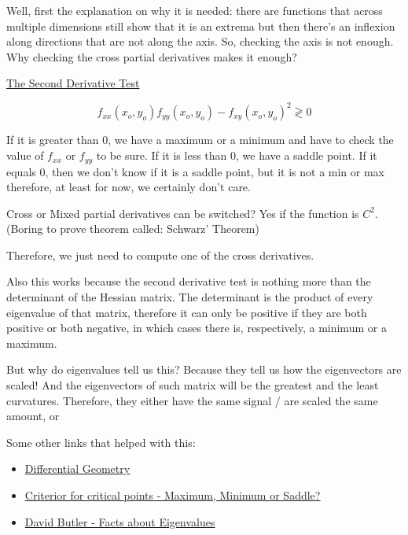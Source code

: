 Well, first the explanation on why it is needed: there are functions that across multiple dimensions still show that it is an extrema but then there's an inflexion along directions that are not along the axis. So, checking the axis is not enough. Why checking the cross partial derivatives makes it enough?

\ul{The Second Derivative Test}

\begin{equation}
    f_{xx}(x_o, y_o) f_{yy}(x_o, y_o) - f_{xy}(x_o, y_o)^2 \gtrless 0
\end{equation}

If it is greater than 0, we have a maximum or a minimum and have to check the value of $f_{xx}$ or $f_{yy}$ to be sure. If it is less than 0, we have a saddle point. If it equals 0, then we don't know if it is a saddle point, but it is not a min or max therefore, at least for now, we certainly don't care.

Cross or Mixed partial derivatives can be switched? Yes if the function is $C^2$. 
(Boring to prove theorem called: Schwarz' Theorem)

Therefore, we just need to compute one of the cross derivatives.


Also this works because the second derivative test is nothing more than the determinant of the Hessian matrix. The determinant is the product of every eigenvalue of that matrix, therefore it can only be positive if they are both positive or both negative, in which cases there is, respectively, a minimum or a maximum. 

But why do eigenvalues tell us this? Because they tell us how the eigenvectors are scaled! And the eigenvectors of such matrix will be the greatest and the least curvatures. Therefore, they either have the same signal / are scaled the same amount, or 



Some other links that helped with this:
\begin{itemize}
    \item \href{http://homepages.inf.ed.ac.uk/rbf/CVonline/LOCAL_COPIES/MORSE/diffgeom.pdf}{\ul{Differential Geometry}}
    \item \href{http://math.mit.edu/classes/18.013A/HTML/chapter11/section02.html}{\ul{Criterior for critical points - Maximum, Minimum or Saddle?}}
    \item \href{https://www.adelaide.edu.au/mathslearning/play/seminars/evalue-magic-tricks-handout.pdf}{David Butler - Facts about Eigenvalues}
\end{itemize}





